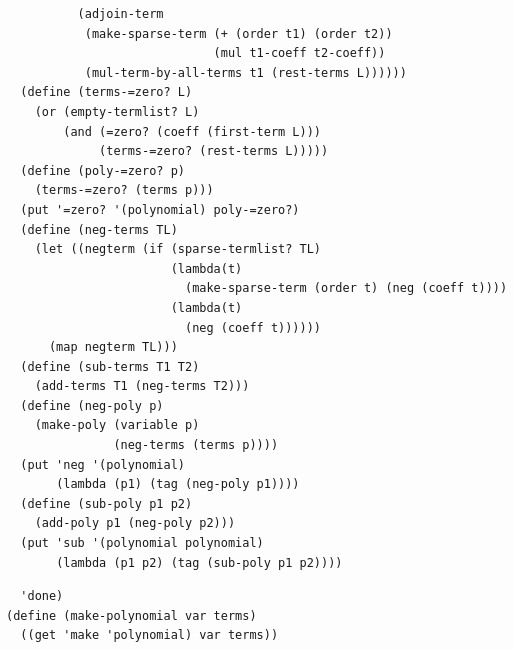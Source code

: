\documentclass[final,fleqn,titlepage,twoside]{article}
\begin{document}
\begin{verbatim}
          (adjoin-term
           (make-sparse-term (+ (order t1) (order t2))
                             (mul t1-coeff t2-coeff))
           (mul-term-by-all-terms t1 (rest-terms L))))))
  (define (terms-=zero? L)
    (or (empty-termlist? L)
        (and (=zero? (coeff (first-term L)))
             (terms-=zero? (rest-terms L)))))
  (define (poly-=zero? p)
    (terms-=zero? (terms p)))
  (put '=zero? '(polynomial) poly-=zero?)
  (define (neg-terms TL)
    (let ((negterm (if (sparse-termlist? TL)
                       (lambda(t)
                         (make-sparse-term (order t) (neg (coeff t))))
                       (lambda(t)
                         (neg (coeff t))))))
      (map negterm TL)))
  (define (sub-terms T1 T2)
    (add-terms T1 (neg-terms T2)))
  (define (neg-poly p)
    (make-poly (variable p)
               (neg-terms (terms p))))
  (put 'neg '(polynomial)
       (lambda (p1) (tag (neg-poly p1))))
  (define (sub-poly p1 p2)
    (add-poly p1 (neg-poly p2)))
  (put 'sub '(polynomial polynomial)
       (lambda (p1 p2) (tag (sub-poly p1 p2))))
\end{verbatim}
\begin{verbatim}
  'done)
(define (make-polynomial var terms)
  ((get 'make 'polynomial) var terms))
\end{verbatim}
\end{document}

